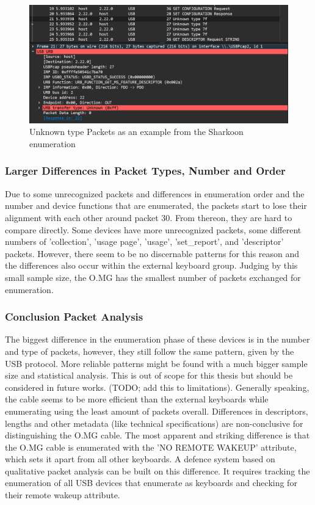 \begin{figure}[H]
    \centering
    \includegraphics[width=0.75\linewidth]{visuals/unknownPacketsSharkoon.png}
    \caption{Unknown type Packets as an example from the Sharkoon enumeration}
    \label{fig:unknownPacketsSharkoon}
\end{figure}


\subsubsection{Larger Differences in Packet Types, Number and Order}

Due to some unrecognized packets and differences in enumeration order and the number and device functions that are enumerated, the packets start to lose their alignment with each other around packet 30. From thereon, they are hard to compare directly. Some devices have more unrecognized packets, some different numbers of 'collection', 'usage page', 'usage', 'set\_report', and 'descriptor' packets. However, there seem to be no discernable patterns for this reason and the differences also occur within the external keyboard group. Judging by this small sample size, the O.MG has the smallest number of packets exchanged for enumeration. 


\subsubsection{Conclusion Packet Analysis}

The biggest difference in the enumeration phase of these devices is in the number and type of packets, however, they still follow the same pattern, given by the USB protocol. More reliable patterns might be found with a much bigger sample size and statistical analysis. This is out of scope for this thesis but should be considered in future works. (TODO; add this to limitations). Generally speaking, the cable seems to be more efficient than the external keyboards while enumerating using the least amount of packets overall.
Differences in descriptors, lengths and other metadata (like technical specifications) are non-conclusive for distinguishing the O.MG cable. 
The most apparent and striking difference is that the O.MG cable is enumerated with the 'NO REMOTE WAKEUP' attribute, which sets it apart from all other keyboards.
A defence system based on qualitative packet analysis can be built on this difference. It requires tracking the enumeration of all USB devices that enumerate as keyboards and checking for their remote wakeup attribute. 

